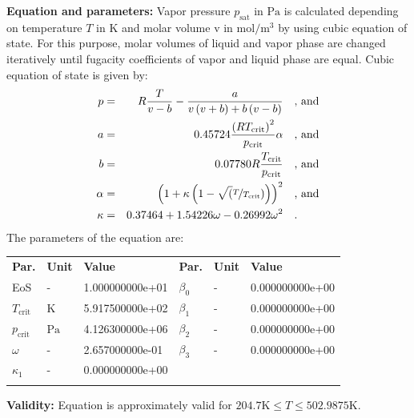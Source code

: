 \textbf{Equation and parameters:}
\newline
%
Vapor pressure $p_\mathrm{sat}$ in $\si{\pascal}$ is calculated depending on temperature $T$ in $\si{\kelvin}$ and molar volume v in $\si{\mole\per\cubic\meter}$ by using cubic equation of state. For this purpose, molar volumes of liquid and vapor phase are changed iteratively until fugacity coefficients of vapor and liquid phase are equal. Cubic equation of state is given by:
\begin{equation*}
\begin{split}
p &=& R \frac{T}{v - b} - \frac{a}{v \left(v + b\right) + b \left(v - b\right)} & \quad\text{, and} \\
a &=& 0.45724 \frac{\left(R T_\mathrm{crit} \right)^2}{p_\mathrm{crit}} \alpha & \quad\text{, and} \\
b &=& 0.07780 R \frac{T_\mathrm{crit}}{p_\mathrm{crit}} & \quad\text{, and} \\
\alpha &=& \left(1 + \kappa \left(1 - \sqrt(\nicefrac{T}{T_\mathrm{crit}}) \right) \right)^2 & \quad\text{, and} \\
\kappa &=& 0.37464 + 1.54226 \omega - 0.26992 \omega^2 & \quad\text{.}
\end{split}
\end{equation*}
%
The parameters of the equation are:
%
\begin{longtable}[l]{lll|lll}
\toprule
\addlinespace
\textbf{Par.} & \textbf{Unit} & \textbf{Value} &	\textbf{Par.} & \textbf{Unit} & \textbf{Value} \\
\addlinespace
\midrule
\endhead

\bottomrule
\endfoot
\bottomrule
\endlastfoot
\addlinespace

EoS & - & 1.000000000e+01 & $\beta_0$ & - & 0.000000000e+00 \\
$T_\mathrm{crit}$ & $\si{\kelvin}$ & 5.917500000e+02 & $\beta_1$ & - & 0.000000000e+00 \\
$p_\mathrm{crit}$ & $\si{\pascal}$ & 4.126300000e+06 & $\beta_2$ & - & 0.000000000e+00 \\
$\omega$ & - & 2.657000000e-01 & $\beta_3$ & - & 0.000000000e+00 \\
$\kappa_1$ & - & 0.000000000e+00 & & & \\

\addlinespace\end{longtable}

\textbf{Validity:}
\newline
Equation is approximately valid for $204.7 \si{\kelvin} \leq T \leq 502.9875 \si{\kelvin}$.
\newline

